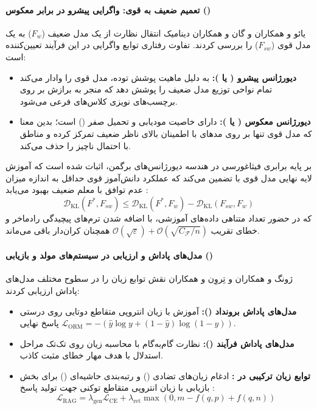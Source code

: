 \paragraph*{تعمیم ضعیف به قوی: واگرایی  پیشرو در برابر معکوس ()}
یائو و همکاران \cite{yao2025revisiting} و گان و همکاران \cite{gan2026beyond} دینامیک انتقال نظارت از یک مدل ضعیف ($F_w$) به یک مدل قوی ($F_{sw}$) را بررسی کردند. تفاوت رفتاری توابع واگرایی در این فرآیند تعیین‌کننده است:
\begin{itemize}
    \item \textbf{دیورژانس  پیشرو ( یا ):} به دلیل ماهیت پوشش توده، مدل قوی را وادار می‌کند تمام نواحی توزیع مدل ضعیف را پوشش دهد که منجر به برازش بر روی برچسب‌های نویزی کلاس‌های فرعی می‌شود.
    \item \textbf{دیورژانس  معکوس ( یا ):} دارای خاصیت مودیابی و تحمیل صفر () است؛ بدین معنا که مدل قوی تنها بر روی مدهای با اطمینان بالای ناظر ضعیف تمرکز کرده و مناطق با احتمال ناچیز را حذف می‌کند.
\end{itemize}
بر پایه برابری فیثاغورسی در هندسه دیورژانس‌های برگمن، اثبات شده است که آموزش لایه نهایی مدل قوی با  تضمین می‌کند که عملکرد دانش‌آموز قوی حداقل به اندازه میزان عدم توافق با معلم ضعیف بهبود می‌یابد \cite{yao2025revisiting}:
\begin{equation}
    \mathcal{D}_{\text{KL}}(F^*, F_{sw}) \le \mathcal{D}_{\text{KL}}(F^*, F_w) - \mathcal{D}_{\text{KL}}(F_{sw}, F_w)
\end{equation}
که در حضور تعداد متناهی داده‌های آموزشی، با اضافه شدن ترم‌های پیچیدگی رادماخر و خطای تقریب $\mathcal{O}(\sqrt{\varepsilon}) + \mathcal{O}(\sqrt{C_{\mathcal{F}}/n})$ همچنان کران‌دار باقی می‌ماند.

\paragraph*{مدل‌های پاداش و ارزیابی در سیستم‌های مولد و بازیابی ()}
ژونگ و همکاران \cite{zhong2025reward} و تِروِن و همکاران \cite{terven2025comprehensive} نقش توابع زیان را در سطوح مختلف مدل‌های پاداش ارزیابی کردند:
\begin{itemize}
    \item \textbf{مدل‌های پاداش برونداد ():} آموزش با زیان انتروپی متقاطع دوتایی روی درستی پاسخ نهایی $\mathcal{L}_{\text{ORM}} = -(\hat{y} \log y + (1 - \hat{y}) \log(1 - y))$.
    \item \textbf{مدل‌های پاداش فرآیند ():} نظارت گام‌به‌گام با محاسبه زیان روی تک‌تک مراحل استدلال با هدف مهار خطای مثبت کاذب.
    \item \textbf{توابع زیان ترکیبی در :} ادغام زیان‌های تضادی () و رتبه‌بندی حاشیه‌ای () برای بخش بازیابی با زیان انتروپی متقاطع توکنی جهت تولید پاسخ \cite{terven2025comprehensive}:
    \begin{equation}
        \mathcal{L}_{\text{RAG}} = \lambda_{\text{gen}} \mathcal{L}_{\text{CE}} + \lambda_{\text{ret}} \max(0, m - f(q, p) + f(q, n))
    \end{equation}
\end{itemize}

